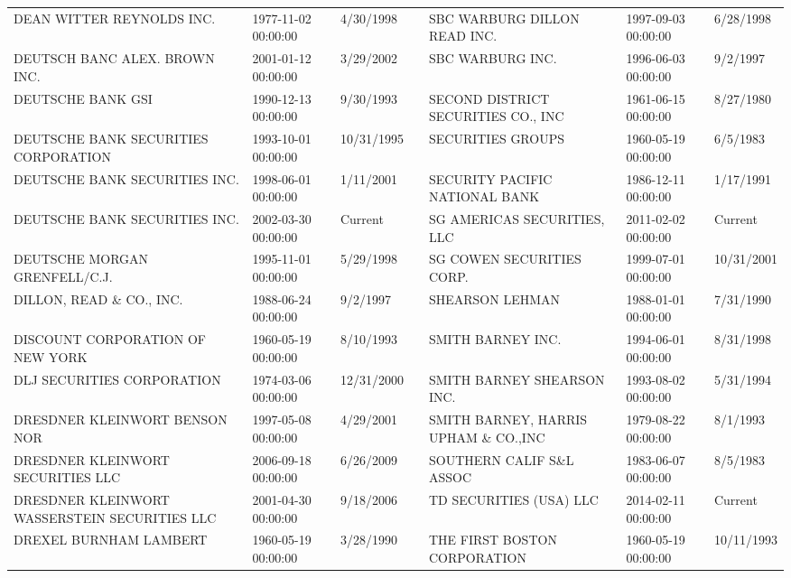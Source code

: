 \documentclass{article}
\begin{document}
\begin{tabular}{lllllll}
DEAN WITTER REYNOLDS INC.           & 1977-11-02 00:00:00 & 4/30/1998 &  & SBC WARBURG DILLON READ INC.    & 1997-09-03 00:00:00 & 6/28/1998 \\
DEUTSCH BANC ALEX. BROWN INC.        & 2001-01-12 00:00:00 & 3/29/2002 &  & SBC WARBURG INC.                & 1996-06-03 00:00:00 & 9/2/1997 \\
DEUTSCHE BANK GSI                    & 1990-12-13 00:00:00 & 9/30/1993 &  & SECOND DISTRICT SECURITIES CO., INC  & 1961-06-15 00:00:00 & 8/27/1980 \\
DEUTSCHE BANK SECURITIES CORPORATION & 1993-10-01 00:00:00 & 10/31/1995 &  & SECURITIES GROUPS                    & 1960-05-19 00:00:00 & 6/5/1983 \\
DEUTSCHE BANK SECURITIES INC.        & 1998-06-01 00:00:00 & 1/11/2001 &  & SECURITY PACIFIC NATIONAL BANK       & 1986-12-11 00:00:00 & 1/17/1991 \\
DEUTSCHE BANK SECURITIES INC.        & 2002-03-30 00:00:00 & Current &  & SG AMERICAS SECURITIES, LLC & 2011-02-02 00:00:00 & Current \\
DEUTSCHE MORGAN GRENFELL/C.J.        & 1995-11-01 00:00:00 & 5/29/1998 &  & SG COWEN SECURITIES CORP.           & 1999-07-01 00:00:00 & 10/31/2001 \\
DILLON, READ \& CO., INC.            & 1988-06-24 00:00:00 & 9/2/1997 &  & SHEARSON LEHMAN                      & 1988-01-01 00:00:00 & 7/31/1990 \\
DISCOUNT CORPORATION OF NEW YORK     & 1960-05-19 00:00:00 & 8/10/1993 &  & SMITH BARNEY INC.                    & 1994-06-01 00:00:00 & 8/31/1998 \\
DLJ SECURITIES CORPORATION          & 1974-03-06 00:00:00 & 12/31/2000 &  & SMITH BARNEY SHEARSON INC.           & 1993-08-02 00:00:00 & 5/31/1994 \\
DRESDNER KLEINWORT BENSON NOR   & 1997-05-08 00:00:00 & 4/29/2001 &  & SMITH BARNEY, HARRIS UPHAM \& CO.,INC & 1979-08-22 00:00:00 & 8/1/1993 \\
DRESDNER KLEINWORT SECURITIES LLC & 2006-09-18 00:00:00 & 6/26/2009 &  & SOUTHERN CALIF S\&L ASSOC            & 1983-06-07 00:00:00 & 8/5/1983 \\
DRESDNER KLEINWORT WASSERSTEIN SECURITIES LLC & 2001-04-30 00:00:00 & 9/18/2006 &  & TD SECURITIES (USA) LLC & 2014-02-11 00:00:00 & Current \\
DREXEL BURNHAM LAMBERT              & 1960-05-19 00:00:00 & 3/28/1990 &  & THE FIRST BOSTON CORPORATION        & 1960-05-19 00:00:00 & 10/11/1993 \\

\end{tabular}
\end{document}
